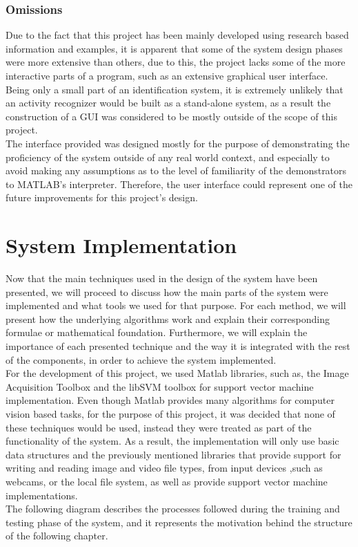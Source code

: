 \documentclass[11pt]{report}
\begin{document}
\subsection{Omissions}
Due to the fact that this project has been mainly developed using research based information and examples, it is apparent that some of the system design phases were more extensive than others, due to this, the project lacks some of the more interactive parts of a program, such as an extensive graphical user interface. Being only a small part of an identification system, it is extremely unlikely that an activity recognizer would be built as a stand-alone system, as a result the construction of a GUI was considered to be mostly outside of the scope of this project. \\
The interface provided was designed mostly for the purpose of demonstrating the proficiency of the system outside of any real world context, and especially to avoid making any assumptions as to the level of familiarity of the demonstrators to MATLAB's interpreter. Therefore, the user interface could represent one of the future improvements for this project's design. \\

\clearpage

\chapter{System Implementation}
Now that the main techniques used in the design of the system have been presented, we will proceed to discuss how the main parts of the system were implemented and what tools we used for that purpose. For each method, we will present how the underlying algorithms work and explain their corresponding formulae or mathematical foundation. Furthermore, we will explain the importance of each presented technique and the way it is integrated with the rest of the components, in order to achieve the system implemented.  \\
For the development of this project, we used Matlab libraries, such as, the Image Acquisition Toolbox and the libSVM toolbox for support vector machine implementation. Even though Matlab provides many algorithms for computer vision based tasks, for the purpose of this project, it was decided that none of these techniques would be used, instead they were treated as part of the functionality of the system. As a result, the implementation will only use basic data structures and the previously mentioned libraries that provide support for writing and reading  image and video file types, from input devices ,such as webcams, or the local file system, as well as provide support vector machine implementations. \\
The following diagram describes the processes followed during the training and testing phase of the system, and it represents the motivation behind the structure of the following chapter. \\
\end{document}
